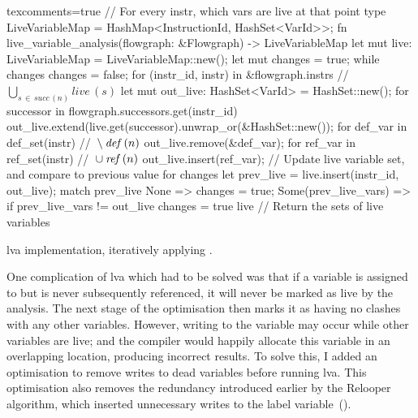\documentclass[00-main.tex]{subfiles}
\begin{document}
\begin{listing}[!t]
  \begin{RustListing*}{texcomments=true}
    // For every instr, which vars are live at that point
    type LiveVariableMap = HashMap<InstructionId, HashSet<VarId>>;
    fn live_variable_analysis(flowgraph: &Flowgraph) -> LiveVariableMap {
        let mut live: LiveVariableMap = LiveVariableMap::new();
        let mut changes = true;
        while changes {
            changes = false;
            for (instr_id, instr) in &flowgraph.instrs {
                // $\bigcup_{s \,\in\, \mathit{succ}\,(n)} \mathit{live}\,(s)$
                let mut out_live: HashSet<VarId> = HashSet::new();
                for successor in flowgraph.successors.get(instr_id) {
                    out_live.extend(live.get(successor).unwrap_or(&HashSet::new());
                }
                for def_var in def_set(instr) { // ${} \setminus \lvadef\,(n)$
                    out_live.remove(&def_var);
                }
                for ref_var in ref_set(instr) { // ${} \cup \lvaref\,(n)$
                    out_live.insert(ref_var);
                }
                // Update live variable set, and compare to previous value for changes
                let prev_live = live.insert(instr_id, out_live);
                match prev_live {
                    None => {
                        changes = true;
                    }
                    Some(prev_live_vars) => {
                        if prev_live_vars != out_live {
                            changes = true
                        }
                    }
                }
            }
        }
        live // Return the sets of live variables
    }
  \end{RustListing*}
  \caption{\Acrlong{lva} implementation, iteratively applying .}%
  \label{lst:lva implementation}
\end{listing}

One complication of \gls{lva} which had to be solved was that if a variable is assigned to but is never subsequently referenced, it will never be marked as live by the analysis.
The next stage of the optimisation then marks it as having no clashes with any other variables.
However, writing to the variable may occur while other variables are live; and the compiler would happily allocate this variable in an overlapping location, producing incorrect results.
To solve this, I added an optimisation to remove writes to dead variables before running \gls{lva}.
This optimisation also removes the redundancy introduced earlier by the Relooper algorithm, which inserted unnecessary writes to the label variable~().
\end{document}
